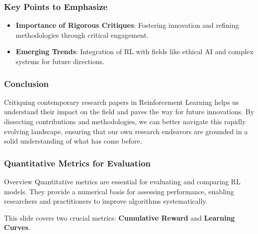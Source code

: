 \documentclass{beamer}
\begin{document}
\begin{frame}[fragile]
    \frametitle{Key Points to Emphasize}
    \begin{itemize}
        \item \textbf{Importance of Rigorous Critiques}: Fostering innovation and refining methodologies through critical engagement.
        \item \textbf{Emerging Trends}: Integration of RL with fields like ethical AI and complex systems for future directions.
    \end{itemize}
\end{frame}

\begin{frame}[fragile]
    \frametitle{Conclusion}
    Critiquing contemporary research papers in Reinforcement Learning helps us understand their impact on the field and paves the way for future innovations. By dissecting contributions and methodologies, we can better navigate this rapidly evolving landscape, ensuring that our own research endeavors are grounded in a solid understanding of what has come before.
\end{frame}

\begin{frame}[fragile]
    \frametitle{Quantitative Metrics for Evaluation}
    \begin{block}{Overview}
        Quantitative metrics are essential for evaluating and comparing RL models. They provide a numerical basis for assessing performance, enabling researchers and practitioners to improve algorithms systematically.
    \end{block}
    This slide covers two crucial metrics: \textbf{Cumulative Reward} and \textbf{Learning Curves}.
\end{frame}
\end{document}
